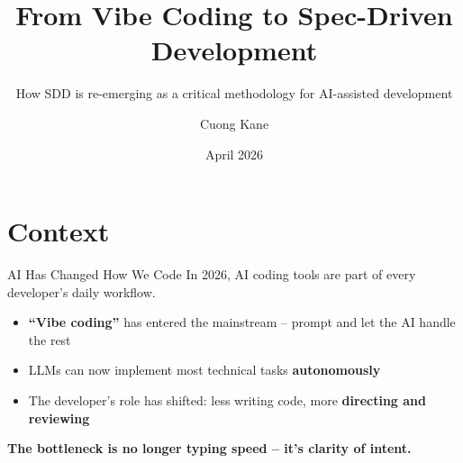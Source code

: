 \documentclass[aspectratio=169]{beamer}
\author{Cuong Kane}
\title[Vibe Coding to SDD]{From Vibe Coding to Spec-Driven Development}
\subtitle{How SDD is re-emerging as a critical methodology for AI-assisted development}
\institute{cuongkane.com}
\date{April 2026}
\begin{document}
\begin{frame}
    {\small \titlepage}
\end{frame}

\section{Context}

\begin{frame}{AI Has Changed How We Code}
    In 2026, AI coding tools are part of every developer's daily workflow.

    \vspace{0.4cm}
    \begin{itemize}
        \item \textbf{``Vibe coding''} has entered the mainstream -- prompt and let the AI handle the rest
        \item LLMs can now implement most technical tasks \textbf{autonomously}
        \item The developer's role has shifted: less writing code, more \textbf{directing and reviewing}
    \end{itemize}

    \vspace{0.5cm}
    \colorbox{utu_blue!20}{\parbox{0.9\textwidth}{
        \centering
        \textbf{The bottleneck is no longer typing speed -- it's clarity of intent.}
    }}
\end{frame}
\end{document}

